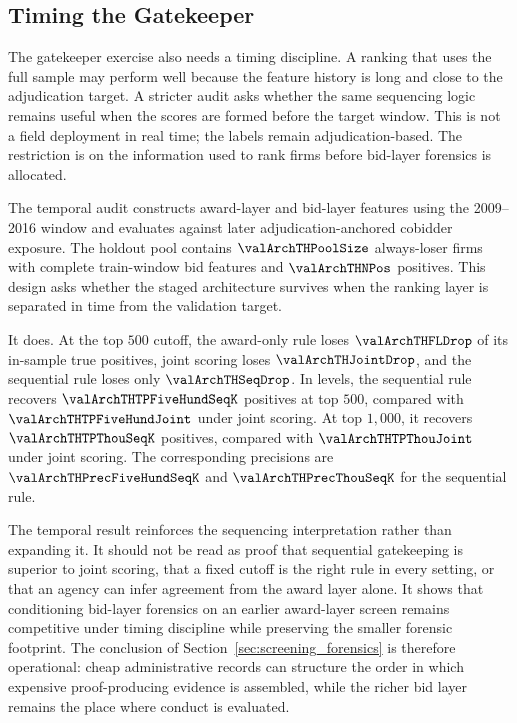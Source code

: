 \subsection{Timing the Gatekeeper}
\label{sec:temporal_gatekeeper}

The gatekeeper exercise also needs a timing discipline. A
ranking that uses the full sample may perform well because the
feature history is long and close to the adjudication target. A
stricter audit asks whether the same sequencing logic remains
useful when the scores are formed before the target window. This
is not a field deployment in real time; the labels remain
adjudication-based. The restriction is on the information used to
rank firms before bid-layer forensics is allocated.

The temporal audit constructs award-layer and bid-layer features
using the 2009--2016 window and evaluates against later
adjudication-anchored cobidder exposure. The holdout pool
contains $\valArchTHPoolSize$ always-loser firms with complete
train-window bid features and $\valArchTHNPos$ positives. This
design asks whether the staged architecture survives when the
ranking layer is separated in time from the validation target.

It does. At the top $500$ cutoff, the award-only rule loses
$\valArchTHFLDrop$ of its in-sample true positives, joint
scoring loses $\valArchTHJointDrop$, and the sequential rule
loses only $\valArchTHSeqDrop$. In levels, the sequential rule
recovers $\valArchTHTPFiveHundSeqK$ positives at top $500$,
compared with $\valArchTHTPFiveHundJoint$ under joint scoring.
At top $1{,}000$, it recovers $\valArchTHTPThouSeqK$ positives,
compared with $\valArchTHTPThouJoint$ under joint scoring. The
corresponding precisions are $\valArchTHPrecFiveHundSeqK$ and
$\valArchTHPrecThouSeqK$ for the sequential rule.

The temporal result reinforces the sequencing interpretation
rather than expanding it. It should not be read as proof that
sequential gatekeeping is superior to joint scoring, that a fixed
cutoff is the right rule in every setting, or that an agency can
infer agreement from the award layer alone. It shows that
conditioning bid-layer forensics on an earlier award-layer screen
remains competitive under timing discipline while preserving the
smaller forensic footprint. The conclusion of
Section~\ref{sec:screening_forensics} is therefore operational:
cheap administrative records can structure the order in which
expensive proof-producing evidence is assembled, while the richer
bid layer remains the place where conduct is evaluated.
